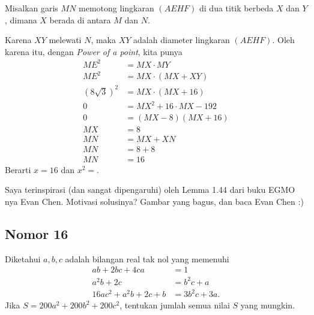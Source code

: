 \begin{jawaban}
Misalkan garis $MN$ memotong lingkaran $(AEHF)$ di dua titik berbeda $X$ dan $Y$, dimana $X$ berada di antara $M$ dan $N$. 

Karena $XY$ melewati $N$, maka $XY$ adalah diameter lingkaran $(AEHF)$. Oleh karena itu, dengan \textit{Power of a point}, kita punya
\begin{align*}
ME^2 &= MX \cdot MY\\
ME^2 &= MX \cdot (MX + XY)\\
(8\sqrt{3})^2 &= MX \cdot (MX + 16)\\
0 &= MX^2 + 16\cdot MX - 192\\
0 &= (MX-8)(MX+16)\\
MX &= 8\\
MN &= MX + XN\\
MN &= 8 + 8\\
MN &= 16
\end{align*}
Berarti $x=16$ dan $x^2=$.

\end{jawaban}
\begin{remark}
Saya terinspirasi (dan sangat dipengaruhi) oleh Lemma 1.44 dari buku EGMO nya Evan Chen. Motivasi solusinya? Gambar yang bagus, dan baca Evan Chen :)
\end{remark}

\newpage
\subsection{Nomor 16}
Diketahui $a,b,c$ adalah bilangan real tak nol yang memenuhi 
\begin{align*}
    ab+2bc+4ca&=1\\
    a^2b+2c&=b^2c+a\\
    16ac^2+a^2b+2c+b &= 3b^2c+3a.
\end{align*}
Jika $S=200a^2+200b^2+200c^2$, tentukan jumlah semua nilai $S$ yang mungkin.

